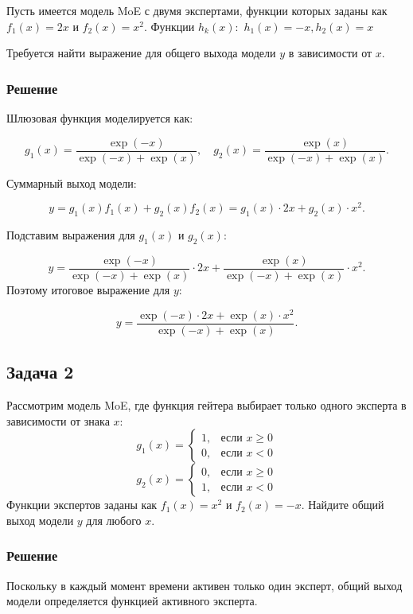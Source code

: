 \documentclass{article}
\begin{document}
Пусть имеется модель MoE с двумя экспертами, функции которых заданы как $f_1(x) = 2x$ и $f_2(x) = x^2$. Функции $h_k (x):$ $h_1 (x) = -x, h_2 (x) = x$

Требуется найти выражение для общего выхода модели $y$ в зависимости от $x$.

\subsubsection*{Решение}

Шлюзовая функция моделируется как:

$$
g_1(x) = \frac{\exp(-x)}{\exp(-x) + \exp(x)}, \quad g_2(x) = \frac{\exp(x)}{\exp(-x) + \exp(x)}.
$$

Суммарный выход модели:

$$
y = g_1(x) f_1(x) + g_2(x) f_2(x) = g_1(x) \cdot 2x + g_2(x) \cdot x^2.
$$

Подставим выражения для $g_1(x)$ и $g_2(x)$:

$$
y = \frac{\exp(-x)}{\exp(-x) + \exp(x)} \cdot 2x + \frac{\exp(x)}{\exp(-x) + \exp(x)} \cdot x^2.
$$
Поэтому итоговое выражение для $y$:

$$
y = \frac{\exp(-x) \cdot 2x + \exp(x) \cdot x^2}{\exp(-x) + \exp(x)}.
$$

\subsection*{Задача 2}


Рассмотрим модель MoE, где функция гейтера выбирает только одного эксперта в зависимости от знака $x$:
\[
g_1(x) = 
\begin{cases} 
1, & \text{если } x \geq 0 \\ 
0, & \text{если } x < 0 
\end{cases}
\]
\[
g_2(x) = 
\begin{cases} 
0, & \text{если } x \geq 0 \\ 
1, & \text{если } x < 0 
\end{cases}
\]
Функции экспертов заданы как $f_1(x) = x^2$ и $f_2(x) = -x$. Найдите общий выход модели $y$ для любого $x$.

\subsubsection*{Решение}

Поскольку в каждый момент времени активен только один эксперт, общий выход модели определяется функцией активного эксперта.
\end{document}

